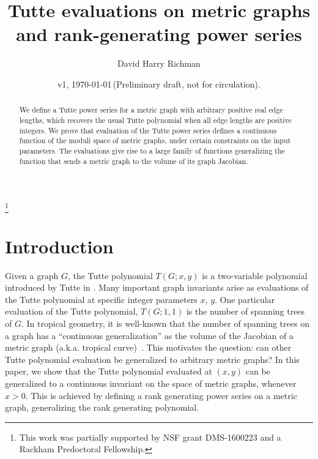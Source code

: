 \documentclass{amsart}
\theoremstyle{definition}
\begin{document}
\title
[Tutte evaluations on metric graphs]
{Tutte evaluations on metric graphs and rank-generating power series}
\author{David Harry Richman}
\date{v1, \today  \,(Preliminary draft, not for circulation).}
\thanks{This work was partially supported by NSF grant DMS-1600223
and a Rackham Predoctoral Fellowship.}


\begin{abstract}
We define a %
Tutte power series for a metric graph with arbitrary positive real edge lengths, 
which recovers the usual Tutte polynomial when all edge lengths are positive integers.
We prove that %
evaluation of the Tutte power series
defines a continuous function of the moduli space of metric graphs,
under certain constraints on the input parameters.
The evaluations give rise to a large family of functions generalizing the function that sends a metric graph to the volume of its graph Jacobian.
\end{abstract}
\maketitle

\setcounter{tocdepth}{1}
\tableofcontents

\section{Introduction}
Given a graph $G$, the Tutte polynomial $T(G;x,y)$ is 
a two-variable polynomial %
introduced by Tutte in \cite{Tut}.
Many important graph invariants arise as evaluations of 
the Tutte polynomial %
at specific integer parameters $x$, $y$.
One particular evaluation of the Tutte polynomial, $T(G; 1, 1)$ is the number of spanning trees of $G$.
In tropical geometry, it is well-known that the number of spanning trees on a graph has a ``continuous generalization'' as the volume of the Jacobian of a metric graph (a.k.a. tropical curve)~\cites{MZ,BF,ABKS}.
This motivates the question: can other Tutte polynomial evaluation be generalized to arbitrary metric graphs?
In this paper, we show that the Tutte polynomial evaluated at $(x, y)$ can be generalized to a continuous invariant on the space of metric graphs, whenever $x > 0$.
This is achieved by defining a rank generating power series on a metric graph,
generalizing the rank generating polynomial.
\end{document}
